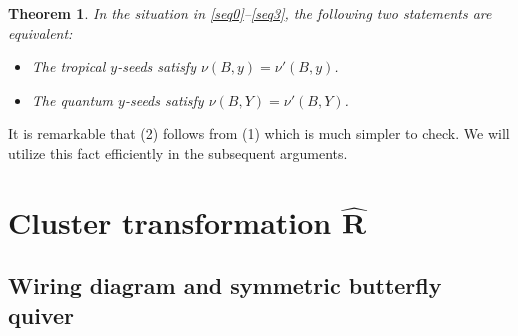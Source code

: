\documentclass[pdftex]{sigma}
\newcommand\bY{Y}
\numberwithin{equation}{section}
\newtheorem{Theorem}{Theorem}[section]
\begin{document}
\begin{Theorem}\label{thm:piv}
 In the situation in \eqref{seq0}--\eqref{seq3}, the following two
 statements are equivalent:
\begin{itemize}\itemsep=0pt

\item[$(1)$]
The tropical $y$-seeds satisfy $\nu (B,y) = \nu'(B,y)$.

\item[$(2)$]
The quantum $y$-seeds satisfy $\nu (B,\bY) = \nu'(B,\bY)$.

\end{itemize}
\end{Theorem}

It is remarkable that (2) follows from (1) which is much simpler to check.
We will utilize this fact efficiently
in the subsequent arguments.


\section[Cluster transformation R]{Cluster transformation $\boldsymbol{\widehat{R}}$}\label{s:ct}

\subsection{Wiring diagram and symmetric butterfly quiver}
\end{document}
